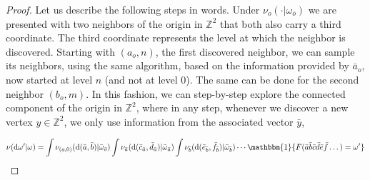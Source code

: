 \documentclass{article}
\theoremstyle{definition}
\newcommand{\1}{\mathbbm{1}}
\newcommand{\0}{\mathbf{o}}
\renewcommand{\d}{\mathrm{d}}
\newcommand{\Z}{\mathbb{Z}}
\begin{document}
\begin{proof}
Let us describe the following steps in words. Under $\nu_{o}(\cdot|\omega_{\bar o})$ we are presented with two neighbors of the origin in $\Z^2$ that both also carry a third coordinate. The third coordinate represents the level at which the neighbor is discovered. Starting with $(a_o,n)$, the first discovered neighbor, we can sample its neighbors, using the same algorithm, based on the information provided by $\bar a_o$, now started at level $n$ (and not at level $0$). The same can be done for the second neighbor $(b_o,m)$. In this fashion, we can step-by-step explore the connected component of the origin in $\Z^2$, where in any step, whenever we discover a new vertex $y\in \Z^2$, we only use information from the associated vector $\bar y$, 

\begin{align*}
\nu(\d \omega'|\omega)=\int \nu_{(o,0)}(\d(\bar a,\bar b)|\bar \omega_{\bar o})\int\nu_{\bar a}(\d(\bar c_{\bar a},\bar d_{\bar a})|\bar \omega_{\bar a})\int\nu_{\bar b}(\d(\bar e_{\bar b},\bar f_{\bar b})|\bar \omega_{\bar b})\cdots \1\{F(\bar a \bar b \bar c \bar d \bar e \bar f\dots)=\omega'\}
\end{align*}


\end{proof}
\end{document}
